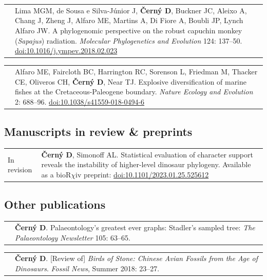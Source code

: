 \documentclass[10pt]{article}
\begin{document}
\begin{tabularx}{\textwidth}{>{\raggedleft\arraybackslash}p{2.2cm} X}
2018 & Lima MGM, de Sousa e Silva-J\'{u}nior J, \textbf{\v{C}ern\'{y} D}, Buckner JC, Aleixo A, Chang J, Zheng J, Alfaro ME, Martins A, Di Fiore A, Boubli JP, Lynch Alfaro JW. A phylogenomic perspective on the robust capuchin monkey (\textit{Sapajus}) radiation. \textit{Molecular Phylogenetics and Evolution} 124: 137--50. \href{http://doi.org/10.1016/j.ympev.2018.02.023}{doi:10.1016/j.ympev.2018.02.023}
\end{tabularx}
\begin{tabularx}{\textwidth}{>{\raggedleft\arraybackslash}p{2.2cm} X}
2018 & Alfaro ME, Faircloth BC, Harrington RC, Sorenson L, Friedman M, Thacker CE, Oliveros CH, \textbf{\v{C}ern\'{y} D}, Near TJ. Explosive diversification of marine fishes at the Cretaceous-Paleogene boundary. \textit{Nature Ecology and Evolution} 2: 688--96. \href{http://doi.org/10.1038/s41559-018-0494-6}{doi:10.1038/s41559-018-0494-6}
\end{tabularx}

\subsection*{Manuscripts in review \& preprints}

\begin{tabularx}{\textwidth}{>{\raggedleft\arraybackslash}p{2.2cm} X}
In revision & \textbf{\v{C}ern\'{y} D}, Simonoff AL. Statistical evaluation of character support reveals the instability of higher-level dinosaur phylogeny. Available as a bioR$\chi$iv preprint: \href{https://www.biorxiv.org/content/10.1101/2023.01.25.525612v1}{doi:10.1101/2023.01.25.525612 }
\end{tabularx}

\subsection*{Other publications}

\begin{tabularx}{\textwidth}{>{\raggedleft\arraybackslash}p{2.2cm} X}
2020 & \textbf{\v{C}ern\'{y} D}. Palaeontology's greatest ever graphs:
Stadler's sampled tree: \textit{The Palaeontology Newsletter} 105: 63--65.
\end{tabularx}
\begin{tabularx}{\textwidth}{>{\raggedleft\arraybackslash}p{2.2cm} X}
2018 & \textbf{\v{C}ern\'{y} D}. [Review of] \textit{Birds of Stone: Chinese Avian Fossils from the Age of Dinosaurs}. \textit{Fossil News}, Summer 2018: 23--27.
\end{tabularx}
\end{document}
